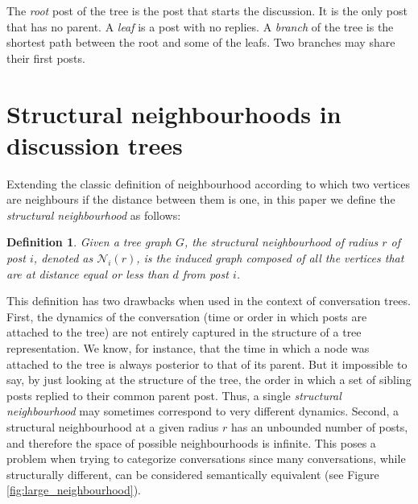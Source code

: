 \documentclass[9pt,technote]{IEEEtran}
\newtheorem{definition}{Definition}
\begin{document}
The \textit{root} post of the tree is the post that starts the discussion. It is the only post that has no parent. A \textit{leaf} is a post with no replies.
A \textit{branch} of the tree is the shortest path between the root and some of the leafs. Two branches may share their first posts.

\section{Structural neighbourhoods in discussion trees}
Extending the classic definition of neighbourhood according to which two vertices are neighbours if the distance between them is one, in this paper we define the \textit{structural neighbourhood} as follows:

\begin{definition}
Given a tree graph $G$, the \textit{structural neighbourhood} of radius $r$ of post $i$, denoted as $\mathcal{N}_i(r)$, is the induced graph composed of all the vertices that are at distance equal or less than $d$ from post $i$.
\end{definition}
This definition has two drawbacks when used in the context of conversation trees.
First, the dynamics of the conversation (time or order in which posts are attached to the tree) are not entirely captured in the structure of a tree representation. We know, for instance, that the time in which a node was attached to the tree is always posterior to that of its parent. But it impossible to say, by just looking at the structure of the tree, the order in which a set of sibling posts replied to their common parent post. Thus, a single \textit{structural neighbourhood} may sometimes correspond to very different dynamics.
Second, a structural neighbourhood at a given radius $r$ has an unbounded number of posts, and therefore the space of possible neighbourhoods is infinite. This poses a problem when trying to categorize conversations since many conversations, while structurally different, can be considered semantically equivalent (see Figure \ref{fig:large_neighbourhood}).
\end{document}
